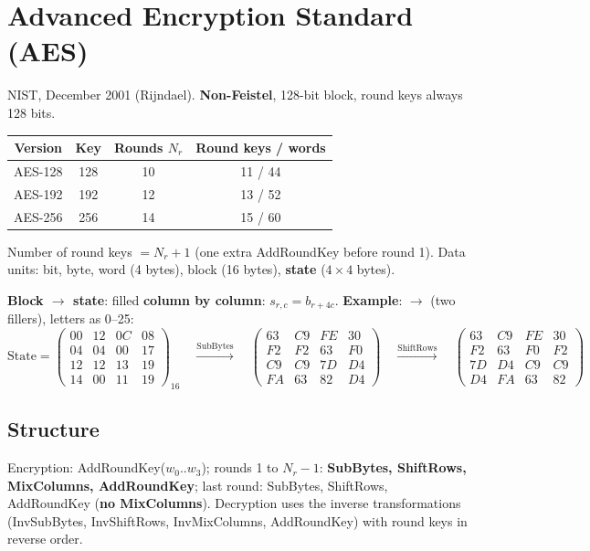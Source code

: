 \section{Advanced Encryption Standard (AES)}\label{sec:aes}

NIST, December 2001 (Rijndael). \textbf{Non-Feistel}, 128-bit block, round keys always 128 bits.
\begin{center}\small
\begin{tabular}{@{}cccc@{}}
\toprule
Version & Key & Rounds $N_r$ & Round keys / words\\
\midrule
AES-128 & 128 & 10 & 11 / 44\\
AES-192 & 192 & 12 & 13 / 52\\
AES-256 & 256 & 14 & 15 / 60\\
\bottomrule
\end{tabular}
\end{center}
Number of round keys $= N_r + 1$ (one extra AddRoundKey before round 1). Data units: bit, byte, word (4 bytes), block (16 bytes), \textbf{state} ($4 \times 4$ bytes).

\textbf{Block $\to$ state}: filled \textbf{column by column}: $s_{r,c} = b_{r + 4c}$.
\textbf{Example}:  $\to$  (two fillers), letters as 0--25:
\[
\text{State} = \begin{pmatrix}00&12&0C&08\\04&04&00&17\\12&12&13&19\\14&00&11&19\end{pmatrix}_{16}
\quad\xrightarrow{\text{SubBytes}}\quad
\begin{pmatrix}63&C9&FE&30\\F2&F2&63&F0\\C9&C9&7D&D4\\FA&63&82&D4\end{pmatrix}
\quad\xrightarrow{\text{ShiftRows}}\quad
\begin{pmatrix}63&C9&FE&30\\F2&63&F0&F2\\7D&D4&C9&C9\\D4&FA&63&82\end{pmatrix}
\]

\subsection{Structure}
Encryption: AddRoundKey($w_0..w_3$); rounds 1 to $N_r - 1$: \textbf{SubBytes, ShiftRows, MixColumns, AddRoundKey}; last round: SubBytes, ShiftRows, AddRoundKey (\textbf{no MixColumns}). Decryption uses the inverse transformations (InvSubBytes, InvShiftRows, InvMixColumns, AddRoundKey) with round keys in reverse order.

